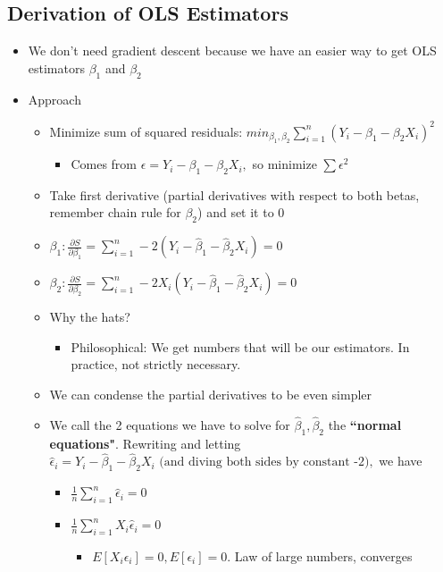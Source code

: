 \documentclass[10pt, oneside]{article}
\begin{document}
\subsection{Derivation of OLS Estimators}
\begin{itemize}
    \item We don't need gradient descent because we have an easier way to get OLS estimators $\beta_1$ and $\beta_2$
    \item Approach
    \begin{itemize}
        \item Minimize sum of squared residuals: $min_{\beta_1, \beta_2} \sum ^n _{i=1} (Y_i - \beta_1 -\beta_2 X_i)^2$
        \begin{itemize}
            \item Comes from $\epsilon =Y_i - \beta_1 -\beta_2 X_i,$ so minimize $\sum \epsilon^2$
        \end{itemize}
        \item Take first derivative (partial derivatives with respect to both betas, remember chain rule for $\beta_2$) and set it to 0
        \item $\beta_1: \frac{\partial S}{\partial \beta_1} = \sum_{i=1} ^ n -2(Y_i -\hat \beta_1 -\hat \beta_2 X_i) = 0$
        \item $\beta_2: \frac{\partial S}{\partial \beta_2} = \sum_{i=1} ^ n -2X_i(Y_i -\hat \beta_1 -\hat \beta_2 X_i) = 0$
        \item Why the hats?
        \begin{itemize}
            \item Philosophical: We get numbers that will be our estimators. In practice, not strictly necessary.
        \end{itemize}
        \item We can condense the partial derivatives to be even simpler
        \item We call the 2 equations we have to solve for $\hat \beta_1, \hat \beta_2$ the \textbf{``normal equations"}. Rewriting and letting $\hat \epsilon_i=Y_i -\hat \beta_1 -\hat \beta_2 X_i \text{ (and diving both sides by constant -2)},$ we have
        \begin{itemize}
            \item $\frac{1}{n}\sum _{i=1} ^ n \hat \epsilon_i = 0$
            \item $\frac{1}{n} \sum_{i=1} ^ n X_i \hat \epsilon_i =0$
            \begin{itemize}
                \item $E[X_i \epsilon_i] = 0, E[\epsilon_i] = 0$. Law of large numbers, converges

\end{itemize}
\end{itemize}
\end{itemize}
\end{itemize}
\end{document}
